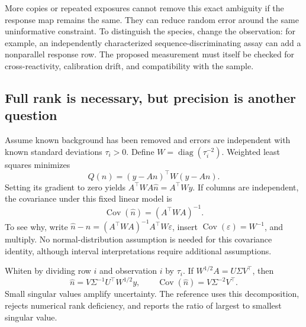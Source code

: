 
More copies or repeated exposures cannot remove this exact ambiguity if the response map remains the same. They can reduce random error around the same uninformative constraint. To distinguish the species, change the observation: for example, an independently characterized sequence-discriminating assay can add a nonparallel response row. The proposed measurement must itself be checked for cross-reactivity, calibration drift, and compatibility with the sample.

\subsection{Full rank is necessary, but precision is another question}
Assume known background has been removed and errors are independent with known standard deviations $\tau_i>0$. Define $W=\operatorname{diag}(\tau_i^{-2})$. Weighted least squares minimizes
\begin{equation}
Q(n)=(y-An)^\top W(y-An).
\end{equation}
Setting its gradient to zero yields $A^\top WA\widehat n=A^\top Wy$. If columns are independent, the covariance under this fixed linear model is
\begin{equation}
\operatorname{Cov}(\widehat n)=(A^\top WA)^{-1}. \label{eq:cov}
\end{equation}
To see why, write $\widehat n-n=(A^\top WA)^{-1}A^\top W\varepsilon$, insert $\operatorname{Cov}(\varepsilon)=W^{-1}$, and multiply. No normal-distribution assumption is needed for this covariance identity, although interval interpretations require additional assumptions.

Whiten by dividing row $i$ and observation $i$ by $\tau_i$. If
$W^{1/2}A=U\Sigma V^\top$, then
\begin{equation}
\widehat n=V\Sigma^{-1}U^\top W^{1/2}y,\qquad
\operatorname{Cov}(\widehat n)=V\Sigma^{-2}V^\top.
\end{equation}
Small singular values amplify uncertainty. The reference uses this decomposition, rejects numerical rank deficiency, and reports the ratio of largest to smallest singular value.

